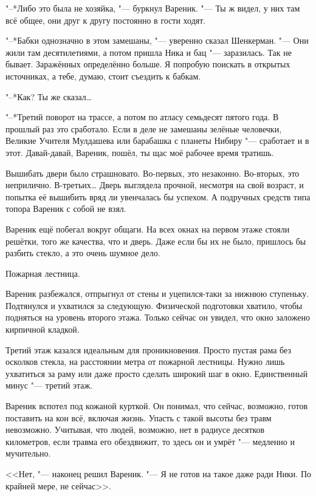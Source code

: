 "--*Либо это была не хозяйка, "--- буркнул Вареник.
"--- Ты ж видел, у них там всё общее, они друг к другу постоянно в гости ходят.

"--*Бабки однозначно в этом замешаны, "--- уверенно сказал Шенкерман.
"--- Они жили там десятилетиями, а потом пришла Ника и бац "--- заразилась.
Так не бывает.
Заражённых определённо больше.
Я попробую поискать в открытых источниках, а тебе, думаю, стоит съездить к бабкам.

"--*Как?
Ты же сказал\dots{}

"--*Третий поворот на трассе, а потом по атласу семьдесят пятого года.
В прошлый раз это сработало.
Если в деле не замешаны зелёные человечки, Великие Учителя Мулдашева или барабашка с планеты Нибиру "--- сработает и в этот.
Давай-давай, Вареник, пошёл, ты щас моё рабочее время тратишь.

\asterism

\textspace

Вышибать двери было страшновато.
Во-первых, это незаконно.
Во-вторых, это неприлично.
В-третьих\dots{}
Дверь выглядела прочной, несмотря на свой возраст, и попытка её вышибить вряд ли увенчалась бы успехом.
А подручных средств типа топора Вареник с собой не взял.

Вареник ещё побегал вокруг общаги.
На всех окнах на первом этаже стояли решётки, того же качества, что и дверь.
Даже если бы их не было, пришлось бы разбить стекло, а это очень шумное дело.

Пожарная лестница.

Вареник разбежался, отпрыгнул от стены и уцепился-таки за нижнюю ступеньку.
Подтянулся и ухватился за следующую.
Физической подготовки хватило, чтобы подняться на уровень второго этажа.
Только сейчас он увидел, что окно заложено кирпичной кладкой.

Третий этаж казался идеальным для проникновения.
Просто пустая рама без осколков стекла, на расстоянии метра от пожарной лестницы.
Нужно лишь ухватиться за раму или даже просто сделать широкий шаг в окно.
Единственный минус "--- третий этаж.

Вареник вспотел под кожаной курткой.
Он понимал, что сейчас, возможно, готов поставить на кон всё, включая жизнь.
Упасть с такой высоты без травм невозможно.
Учитывая, что людей, возможно, нет в радиусе десятков километров, если травма его обездвижит, то здесь он и умрёт "--- медленно и мучительно.

<<Нет, "--- наконец решил Вареник.
"--- Я не готов на такое даже ради Ники.
По крайней мере, не сейчас>>.

